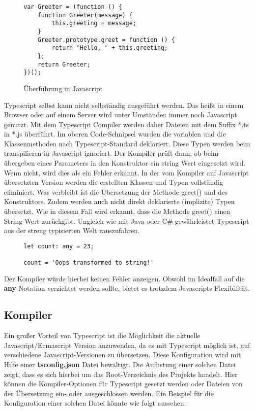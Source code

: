 \begin{figure}[H]
\begin{lstlisting}
var Greeter = (function () {
    function Greeter(message) {
        this.greeting = message;
    }
    Greeter.prototype.greet = function () {
        return "Hello, " + this.greeting;
    };
    return Greeter;
})(); 
\end{lstlisting}
\caption{Überführung in Javascript \cite{typescript-example}}
\end{figure}

\noindent
Typescript selbst kann nicht selbständig ausgeführt werden. Das heißt in einem Browser oder auf einem Server wird unter Umständen immer noch Javascript genutzt. Mit dem Typescript Compiler werden daher Dateien mit dem Suffix *.ts in *.js überführt. Im oberen Code-Schnipsel wurden die variablen und die Klassenmethoden nach Typescript-Standard deklariert. Diese Typen werden beim transpilieren in Javascript ignoriert. Der Kompiler prüft dann, ob beim übergeben eines Parameters in den Konstruktor ein string Wert eingesetzt wird. Wenn nicht, wird dies als ein Fehler erkannt. In der vom Kompiler auf Javascript übersetzten Version werden die erstellten Klassen und Typen vollständig eliminiert. Was verbleibt ist die Übersetzung der Methode greet() und des Konstruktors. Zudem werden auch nicht direkt deklarierte (implizite) Typen übersetzt. Wie in diesem Fall wird erkannt, dass die Methode greet() einen String-Wert zurückgibt. Ungleich wie mit Java oder C\# gewährleistet Typescript aus der streng typisierten Welt rauszufahren.

\begin{figure}[H]
\begin{lstlisting}
let count: any = 23;

count = 'Oops transformed to string!'
\end{lstlisting}
\end{figure}

\noindent
Der Kompiler würde hierbei keinen Fehler anzeigen. Obwohl im Idealfall auf die \textbf{any}-Notation verzichtet werden sollte, bietet es trotzdem Javascripts Flexibilität. 

\subsection{Kompiler}
Ein großer Vorteil von Typescript ist die Möglichkeit die aktuelle Javascript/Ecmascript Version anzuwenden, da es mit Typescript möglich ist, auf verschiedene Javascript-Versionen zu übersetzen. Diese Konfiguration wird mit Hilfe einer \textbf{tsconfig.json} Datei bewältigt. Die Auflistung einer solchen Datei zeigt, dass es sich hierbei um das Root-Verzeichnis des Projekts handelt. Hier können die Kompiler-Optionen für Typescript gesetzt werden oder Dateien von der Übersetzung ein- oder ausgeschlossen werden. Ein Beispiel für die Konfiguration einer solchen Datei könnte wie folgt aussehen: 

